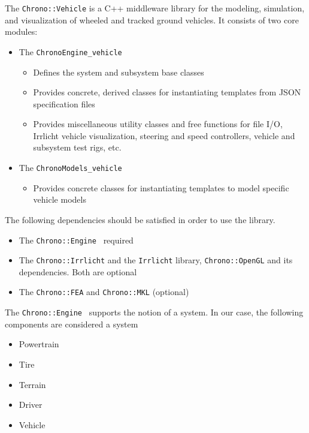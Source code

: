 The \lstinline{Chrono::Vehicle} is a C++ middleware library for the modeling, simulation, and visualization of wheeled and tracked ground vehicles.
It consists of two core modules:

\begin{itemize}
\item The \lstinline{ChronoEngine_vehicle}

	\begin{itemize}
		\item Defines the system and subsystem base classes
		\item Provides concrete, derived classes for instantiating templates from JSON specification files
		\item Provides miscellaneous utility classes and free functions for file I/O, Irrlicht vehicle visualization, steering and speed controllers, vehicle and subsystem test rigs, etc.
	\end{itemize}

\item The \lstinline{ChronoModels_vehicle}
	\begin{itemize}
		\item Provides concrete classes for instantiating templates to model specific vehicle models
	\end{itemize}
\end{itemize}

The following dependencies should be satisfied in order to use the library.

\begin{itemize}
\item The \lstinline{Chrono::Engine } required
\item The \lstinline{Chrono::Irrlicht} and the \lstinline{Irrlicht} library,  \lstinline{Chrono::OpenGL} and its dependencies. Both are optional
\item The \lstinline{Chrono::FEA} and \lstinline{Chrono::MKL} (optional)
\end{itemize}

The \lstinline{Chrono::Engine } supports the notion of a system. In our case, the following components are considered a system

\begin{itemize}
\item Powertrain
\item Tire
\item Terrain
\item Driver
\item Vehicle
\end{itemize}


